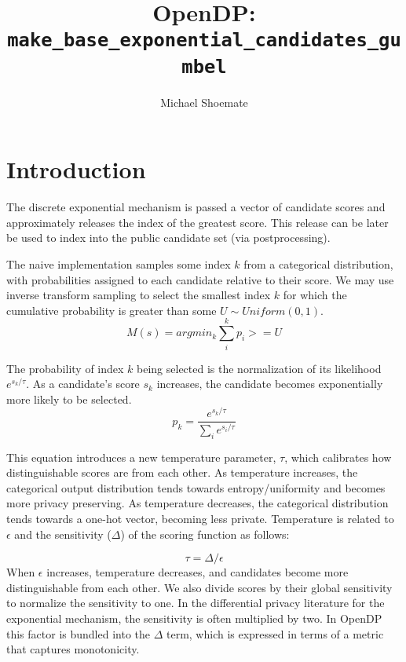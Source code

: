 \documentclass{article}
\title{OpenDP: \texttt{make\_base\_exponential\_candidates\_gumbel}}
\author{Michael Shoemate}
\begin{document}
\maketitle

\section{Introduction}
The discrete exponential mechanism is passed a vector of candidate scores 
and approximately releases the index of the greatest score.
This release can be later be used to index into the public candidate set (via postprocessing).

The naive implementation samples some index $k$ from a categorical distribution, 
with probabilities assigned to each candidate relative to their score.
We may use inverse transform sampling to select the smallest index $k$ for which the cumulative probability is greater than some $U \sim Uniform(0, 1)$.
\begin{equation}
    \label{m-naive}
    M(s) = argmin_k \sum_i^k p_i >= U
\end{equation}

The probability of index $k$ being selected is the normalization of its likelihood $e^{s_k / \tau}$.
As a candidate's score $s_k$ increases, the candidate becomes exponentially more likely to be selected.
\begin{equation}
    \label{prob-of-k}
    p_k = \frac{e^{s_k / \tau}}{\sum_i e^{s_i / \tau}}
\end{equation}

This equation introduces a new temperature parameter, $\tau$, which calibrates how distinguishable scores are from each other.
As temperature increases, the categorical output distribution tends towards entropy/uniformity and becomes more privacy preserving.
As temperature decreases, the categorical distribution tends towards a one-hot vector, becoming less private.
Temperature is related to $\epsilon$ and the sensitivity ($\Delta$) of the scoring function as follows:

\begin{equation}
    \tau = \Delta / \epsilon
\end{equation}
When $\epsilon$ increases, temperature decreases, and candidates become more distinguishable from each other.
We also divide scores by their global sensitivity to normalize the sensitivity to one.
In the differential privacy literature for the exponential mechanism, the sensitivity is often multiplied by two.
In OpenDP this factor is bundled into the $\Delta$ term, which is expressed in terms of a metric that captures monotonicity.
\end{document}
